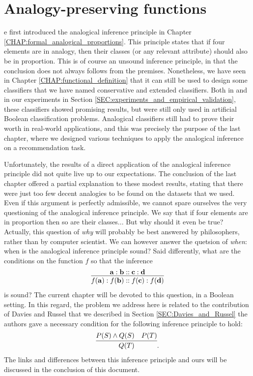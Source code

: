 \chapter{Analogy-preserving functions}

e first introduced the analogical inference principle in Chapter
\ref{CHAP:formal_analogical_proportions}. This principle states that if four
elements are in analogy, then their classes (or any relevant attribute) should
also be in proportion. This is of course an unsound inference principle, in
that the conclusion does not always follows from the premises. Nonetheless, we
have seen in Chapter \ref{CHAP:functional_definition} that it can still be used
to design some classifiers that we have named conservative and extended
classifiers.  Both in \cite{BayMicDelIJCAI07} and in our experiments in Section
\ref{SEC:experiments_and_empirical_validation}, these classifiers
showed promising results, but were still only used in artificial Boolean
classification problems. Analogical classifiers still had to prove their worth
in real-world applications, and this was precisely the purpose of the last
chapter, where we designed various techniques to apply the analogical inference
on a recommendation task.

Unfortunately, the results of a direct application of the analogical inference
principle did not quite live up to our expectations. The conclusion of the last
chapter offered a partial explanation to these modest results, stating that
there were just too few decent analogies to be found on the datasets that we
used. Even if this argument is perfectly admissible, we cannot spare ourselves
the very questioning of the analogical inference principle. We say that if
four elements are in proportion then so are their classes... But why should it
even be true? Actually, this question of \textit{why} will probably be best
answered by philosophers, rather than by computer scientist. We can however
answer the quetsion of \textit{when}: when is the analogical inference
principle sound? Said differently, what are the conditions on the function $f$
so that the inference
$$
\infer{f(\mathbf{a}) : f(\mathbf{b}) :: f(\mathbf{c})
: f(\mathbf{d})}{\mathbf{a} : \mathbf{b} :: \mathbf{c} : \mathbf{d}}
$$
is sound? The current chapter will be devoted to this question, in a Boolean
setting. In this regard,
the problem we address here is related to the contribution of Davies and Russel
that we described in Section \ref{SEC:Davies_and_Russel} the authors gave a
necessary condition for the following inference principle to hold:
$$\infer{Q(T)}{P(S) \wedge Q(S) & P(T)}.$$
The links and differences between this inference principle and ours will be
discussed in the conclusion of this document.

